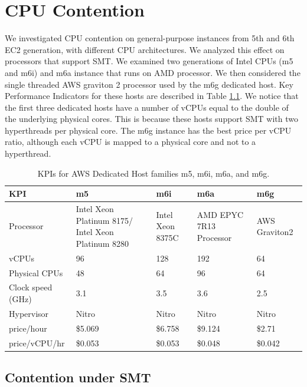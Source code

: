 \chapter{CPU Contention}
We investigated CPU contention on general-purpose instances from 5th and 6th EC2 generation, with 
different CPU architectures. We analyzed this effect on processors that support 
\acl{SMT}. We examined two generations of Intel CPUs (m5 and m6i) and m6a instance 
that runs on AMD processor. We then considered the single threaded AWS graviton 2 
processor used by the m6g dedicated host. Key Performance Indicators for these hosts are described 
in Table \ref{tab:dedicated-hosts}. We notice that the first three dedicated hosts have a number of vCPUs 
equal to the double of the underlying physical cores. This is because these hosts support \ac{SMT} with 
two hyperthreads per physical core. The m6g instance has the best price per vCPU ratio, although each 
vCPU is mapped to a physical core and not to a hyperthread.

\renewcommand{\arraystretch}{1.5} %
\begin{table}[h]
\centering
\begin{tabular}{|l|p{2cm}|p{2cm}|p{2cm}|p{2cm}|}
\hline
KPI & m5 & m6i & m6a & m6g \\
\hline
Processor \cite{cloudspecs} & Intel Xeon Platinum 8175/ Intel Xeon Platinum 8280	 & Intel Xeon 8375C & AMD EPYC 7R13 Processor & AWS Graviton2 \\
\hline
vCPUs \cite{pricing} & 96 & 128 & 192 & 64 \\
\hline
Physical CPUs \cite{pricing} & 48 & 64 & 96 & 64 \\
\hline
Clock speed (GHz) \cite{vantage} & 3.1 & 3.5 & 3.6 & 2.5\\
\hline
Hypervisor \cite{hypervisorSpec} & Nitro & Nitro & Nitro & Nitro \\
\hline
price/hour \cite{pricing} & \$5.069 & \$6.758 & \$9.124 & \$2.71 \\
\hline
price/vCPU/hr & \$0.053 & \$0.053 & \$0.048 & \$0.042 \\
\hline
\end{tabular}
\caption{KPIs for AWS Dedicated Host families m5, m6i, m6a, and m6g.}
\label{tab:dedicated-hosts}
\end{table}


\section{Contention under SMT}
